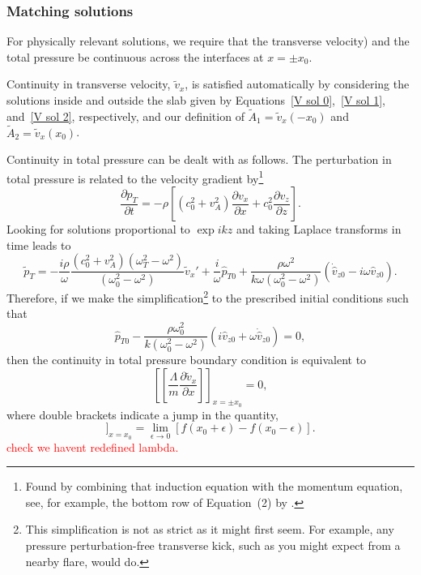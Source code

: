 \documentclass[12pt]{../style-files/ociamthesis}
\begin{document}
\subsubsection{Matching solutions}

For physically relevant solutions, we require that the transverse velocity) and the total pressure be continuous across the interfaces at $x = \pm x_0$.

Continuity in transverse velocity, $\tilde{v}_x$, is satisfied automatically by considering the solutions inside and outside the slab given by Equations~\eqref{V sol 0},~\eqref{V sol 1}, and~\eqref{V sol 2}, respectively, and our definition of $\tilde{A}_1 = \tilde{v}_x(-x_0)$ and $\tilde{A}_2 = \tilde{v}_x(x_0)$.

Continuity in total pressure can be dealt with as follows. The perturbation in total pressure is related to the velocity gradient by\footnote{Found by combining that induction equation with the momentum equation, see, for example, the bottom row of Equation~(2) by \cite{and_etal07}.}
\begin{equation}
\frac{\partial p_T}{\partial t} = -\rho\left[ \left(c_0^2 + v_A^2\right) \frac{\partial v_x}{\partial x} + c_0^2\frac{\partial v_z}{\partial z} \right].
\end{equation}
Looking for solutions proportional to $\exp{ikz}$ and taking Laplace transforms in time leads to
\begin{equation}
\tilde{p}_T = -\frac{i\rho}{\omega} \frac{(c_0^2 + v_A^2)(\omega_T^2 - \omega^2)}{(\omega_0^2 - \omega^2)} \tilde{v}_x' + \frac{i}{\omega} \hat{p}_{T0} + \frac{\rho \omega^2}{k\omega(\omega_0^2 - \omega^2)} \left(\dot{\hat{v}}_{z0} - i\omega\hat{v}_{z0}\right).
\end{equation}
Therefore, if we make the simplification\footnote{This simplification is not as strict as it might first seem. For example, any pressure perturbation-free transverse kick, such as you might expect from a nearby flare, would do.} to the prescribed initial conditions such that
\begin{equation}
\hat{p}_{T0} - \frac{\rho \omega_0^2}{k(\omega_0^2 - \omega^2)} \left(i\hat{v}_{z0} + \omega\dot{\hat{v}}_{z0}\right) = 0,
\end{equation}
then the continuity in total pressure boundary condition is equivalent to
\begin{equation}
\left[ \left[ \frac{\Lambda}{m} \frac{\partial \tilde{v}_x}{\partial x} \right] \right]_{x=\pm x_0} = 0,
\end{equation}
where double brackets indicate a jump in the quantity,
\begin{equation}
[[f]]_{x=x_0} = \lim_{\epsilon \to 0} [f(x_0 + \epsilon) - f(x_0 - \epsilon)].
\end{equation}
\textcolor{red}{check we havent redefined lambda.}
\end{document}

